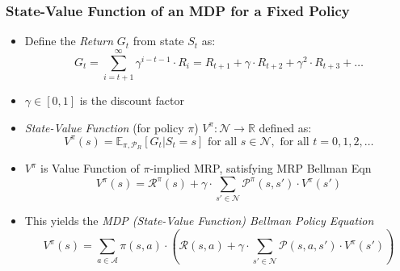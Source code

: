\documentclass[handout]{beamer}
\begin{document}
\begin{frame}
\frametitle{State-Value Function of an MDP for a Fixed Policy}
\pause
\begin{itemize}[<+->]
\item Define the {\em Return} $G_t$ from state $S_t$ as:
$$G_t = \sum_{i=t+1}^{\infty} \gamma^{i-t-1} \cdot R_i = R_{t+1} + \gamma \cdot R_{t+2} + \gamma^2 \cdot R_{t+3} + \ldots$$
\item $\gamma \in [0, 1]$ is the discount factor
\item {\em State-Value Function} (for policy $\pi$) $V^{\pi}: \mathcal{N} \rightarrow \mathbb{R}$ defined as:
$$V^{\pi}(s) = \mathbb{E}_{\pi, \mathcal{P}_R}[G_t|S_t=s] \text{ for all } s \in \mathcal{N}, \text{ for all } t = 0, 1, 2, \ldots$$
\item $V^{\pi}$ is Value Function of $\pi$-implied MRP, satisfying MRP Bellman Eqn
$$V^{\pi}(s) = \mathcal{R}^{\pi}(s) + \gamma \cdot \sum_{s' \in \mathcal{N}} \mathcal{P}^{\pi}(s,s') \cdot V^{\pi}(s')$$
\item This yields the {\em MDP (State-Value Function) Bellman Policy Equation}
\begin{equation}
V^{\pi}(s) = \sum_{a\in \mathcal{A}} \pi(s,a) \cdot (\mathcal{R}(s,a) + \gamma \cdot \sum_{s'\in \mathcal{N}} \mathcal{P}(s,a,s') \cdot V^{\pi}(s'))
\label{eq:mdp_bellman_policy_eqn_vv}
\end{equation}
\end{itemize}
\end{frame}
\end{document}
